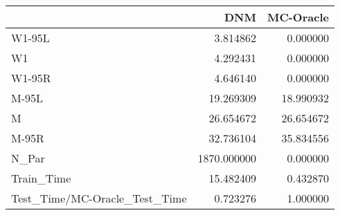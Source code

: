 \begin{tabular}{lrr}
\toprule
{} &          DNM &  MC-Oracle \\
\midrule
W1-95L                        &     3.814862 &   0.000000 \\
W1                            &     4.292431 &   0.000000 \\
W1-95R                        &     4.646140 &   0.000000 \\
M-95L                         &    19.269309 &  18.990932 \\
M                             &    26.654672 &  26.654672 \\
M-95R                         &    32.736104 &  35.834556 \\
N\_Par                         &  1870.000000 &   0.000000 \\
Train\_Time                    &    15.482409 &   0.432870 \\
Test\_Time/MC-Oracle\_Test\_Time &     0.723276 &   1.000000 \\
\bottomrule
\end{tabular}
